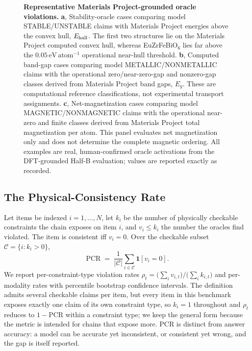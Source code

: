 \documentclass[pdflatex,sn-nature]{sn-jnl}
\begin{document}
\begin{figure}[!htbp]

\caption{\justifying\textbf{Representative Materials Project-grounded oracle
violations.}
\textbf{a}, Stability-oracle cases comparing model STABLE/UNSTABLE claims with
Materials Project energies above the convex hull, $E_{\rm hull}$. The first two
structures lie on the Materials Project computed convex hull, whereas
EuZrFeBiO$_6$ lies far above the
$0.05\,\mathrm{eV\,atom^{-1}}$ operational near-hull threshold.
\textbf{b}, Computed band-gap cases comparing model METALLIC/NONMETALLIC claims
with the operational zero/near-zero-gap and nonzero-gap classes derived from
Materials Project band gaps, $E_g$. These are computational reference
classifications, not experimental transport assignments.
\textbf{c}, Net-magnetization cases comparing model MAGNETIC/NONMAGNETIC claims
with the operational near-zero and finite classes derived from Materials Project
total magnetization per atom. This panel evaluates net magnetization only and
does not determine the complete magnetic ordering. All examples are real,
human-confirmed oracle activations from the DFT-grounded Half-B evaluation;
values are reported exactly as recorded.}
\label{fig:dft-oracle-cases}
\end{figure}




\subsection*{The Physical-Consistency Rate}
Let items be indexed $i=1,\dots,N$, let $k_i$ be the number of physically checkable
constraints the chain exposes on item $i$, and $v_i \le k_i$ the number the oracles
find violated. The item is consistent iff $v_i=0$. Over the checkable subset
$\mathcal{C}=\{i:k_i>0\}$,
\begin{equation}
\mathrm{PCR} \;=\; \frac{1}{|\mathcal{C}|}\sum_{i\in\mathcal{C}} \mathbf{1}[v_i = 0].
\end{equation}
We report per-constraint-type violation rates
$\rho_t=\big(\sum_i v_{i,t}\big)/\big(\sum_i k_{i,t}\big)$ and per-modality rates with
percentile bootstrap confidence intervals. The definition admits several checkable claims per
item, but every item in this benchmark exposes exactly one claim of its own constraint type,
so $k_i=1$ throughout and $\rho_t$ reduces to $1-\mathrm{PCR}$ within a constraint type; we
keep the general form because the metric is intended for chains that expose more. PCR is distinct from answer accuracy: a
model can be accurate yet inconsistent, or consistent yet wrong, and the gap is
itself reported.
\end{document}
